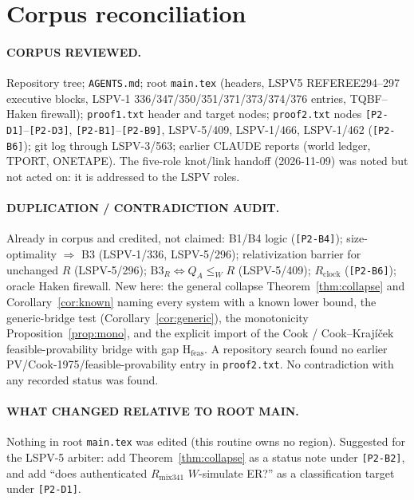 \documentclass[11pt]{article}
\theoremstyle{definition}
\theoremstyle{remark}
\begin{document}
\section{Corpus reconciliation}

\paragraph{CORPUS REVIEWED.} Repository tree; \texttt{AGENTS.md}; root
\texttt{main.tex} (headers, LSPV5 REFEREE294--297 executive blocks, LSPV-1
336/347/350/351/371/373/374/376 entries, TQBF--Haken firewall);
\texttt{proof1.txt} header and target nodes; \texttt{proof2.txt} nodes
\texttt{[P2-D1]}--\texttt{[P2-D3]}, \texttt{[P2-B1]}--\texttt{[P2-B9]},
LSPV-5/409, LSPV-1/466, LSPV-1/462 (\texttt{[P2-B6]}); git log through
LSPV-3/563; earlier CLAUDE reports (world ledger, TPORT, ONETAPE).
The five-role knot/link handoff (2026-11-09) was noted but not acted on: it is
addressed to the LSPV roles.

\paragraph{DUPLICATION / CONTRADICTION AUDIT.}
Already in corpus and credited, not claimed: B1/B4 logic (\texttt{[P2-B4]});
size-optimality $\Rightarrow$ B3 (LSPV-1/336, LSPV-5/296); relativization barrier
for unchanged $R$ (LSPV-5/296); $\mathrm{B3}_R\iff Q_A\le_W R$ (LSPV-5/409);
$R_{\mathrm{clock}}$ (\texttt{[P2-B6]}); oracle Haken firewall.
New here: the general collapse Theorem~\ref{thm:collapse} and
Corollary~\ref{cor:known} naming every system with a known lower bound, the
generic-bridge test (Corollary~\ref{cor:generic}), the monotonicity
Proposition~\ref{prop:mono}, and the explicit import of the Cook /
Cook--Kraj\'i\v{c}ek feasible-provability bridge with gap $\mathrm{H}_{\mathrm{feas}}$.
A repository search found no earlier PV/Cook-1975/feasible-provability entry in
\texttt{proof2.txt}. No contradiction with any recorded status was found.

\paragraph{WHAT CHANGED RELATIVE TO ROOT MAIN.} Nothing in root
\texttt{main.tex} was edited (this routine owns no region). Suggested for the
LSPV-5 arbiter: add Theorem~\ref{thm:collapse} as a status note under
\texttt{[P2-B2]}, and add ``does authenticated $R_{\mathrm{mix341}}$ $W$-simulate
ER?'' as a classification target under \texttt{[P2-D1]}.
\end{document}

